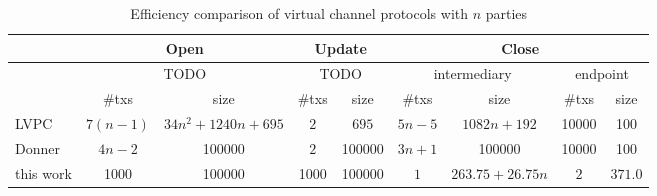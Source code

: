   \begin{table*}
    \caption{Efficiency comparison of virtual channel protocols with $n$
    parties}
    \label{table:comparison:overhead:n-parties}
    \begin{minipage}{\textwidth}
    \begin{center}
    \begin{tabular}{|l|c|c|c|c|c|c|c|c|}
    \hline
              & \multicolumn{2}{|c|}{Open} & \multicolumn{2}{|c|}{Update} &
              \multicolumn{4}{|c|}{Close} \\
    \hline
              & \multicolumn{2}{|c|}{TODO} & \multicolumn{2}{|c|}{TODO} &
              \multicolumn{2}{|c|}{intermediary} & \multicolumn{2}{|c|}{endpoint} \\
    \hline
              & \#txs & size & \#txs & size & \#txs & size & \#txs & size \\
    \hline
    LVPC      & $7(n-1)$ & $34n^2+1240n+695$ & $2$ & $695$ & $5n-5$ &
              $1082n+192$ & 10000 & 100 \\
    \hline
    Donner    & $4n-2$ & 100000 & $2$ & 100000 & $3n+1$ & 100000 & 10000 & 100 \\
    \hline
    this work & 1000 & 100000 & 1000 & 100000 & $1$ & $263.75 + 26.75n$ & $2$ &
    $371.0$ \\
    \hline
    \end{tabular}
    \end{center}
    \end{minipage}
  \end{table*}
